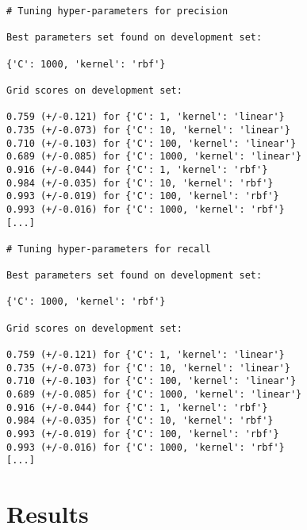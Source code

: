 \documentclass{article}
\begin{document}
\begin{verbatim}
# Tuning hyper-parameters for precision

Best parameters set found on development set:

{'C': 1000, 'kernel': 'rbf'}

Grid scores on development set:

0.759 (+/-0.121) for {'C': 1, 'kernel': 'linear'}
0.735 (+/-0.073) for {'C': 10, 'kernel': 'linear'}
0.710 (+/-0.103) for {'C': 100, 'kernel': 'linear'}
0.689 (+/-0.085) for {'C': 1000, 'kernel': 'linear'}
0.916 (+/-0.044) for {'C': 1, 'kernel': 'rbf'}
0.984 (+/-0.035) for {'C': 10, 'kernel': 'rbf'}
0.993 (+/-0.019) for {'C': 100, 'kernel': 'rbf'}
0.993 (+/-0.016) for {'C': 1000, 'kernel': 'rbf'}
[...]

# Tuning hyper-parameters for recall

Best parameters set found on development set:

{'C': 1000, 'kernel': 'rbf'}

Grid scores on development set:

0.759 (+/-0.121) for {'C': 1, 'kernel': 'linear'}
0.735 (+/-0.073) for {'C': 10, 'kernel': 'linear'}
0.710 (+/-0.103) for {'C': 100, 'kernel': 'linear'}
0.689 (+/-0.085) for {'C': 1000, 'kernel': 'linear'}
0.916 (+/-0.044) for {'C': 1, 'kernel': 'rbf'}
0.984 (+/-0.035) for {'C': 10, 'kernel': 'rbf'}
0.993 (+/-0.019) for {'C': 100, 'kernel': 'rbf'}
0.993 (+/-0.016) for {'C': 1000, 'kernel': 'rbf'}
[...]
\end{verbatim}
\section{Results}
\end{document}

